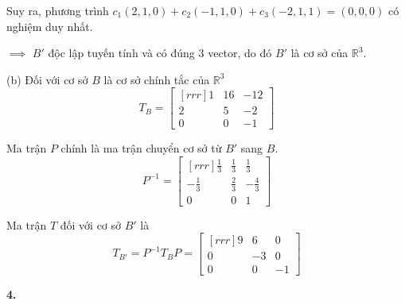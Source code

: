 \documentclass{article}
\newcommand\R{\mathbb{R}}
\begin{document}
    Suy ra, phương trình $c_1(2,1,0) + c_2(-1,1,0) + c_3(-2,1,1) = (0,0,0)$ có nghiệm duy nhất.

    $\implies$ $B'$ độc lập tuyến tính và có đúng $3$ vector, do đó $B'$ là cơ sở của $\R^3$.

    (b) Đối với cơ sở $B$ là cơ sở chính tắc của $ \R^3 $
    \[T_B = \begin{bmatrix}[rrr]
        1 & 16 & -12 \\
        2 & 5 & -2 \\
        0 & 0 & -1 
    \end{bmatrix} \]

    Ma trận $P$ chính là ma trận chuyển cơ sở từ $B'$ sang $B$. 
    \[P^{-1} = \begin{bmatrix}[rrr]
        \frac{1}{3} & \frac{1}{3} & \frac{1}{3} \\
        - \frac{1}{3} & \frac{2}{3} & -\frac{4}{3} \\
        0 & 0 & 1 
    \end{bmatrix} \]

    Ma trận $T$ đối với cơ sở $B'$ là 
    \[T_{B'} = P^{-1}T_BP = \begin{bmatrix}[rrr]
        9 & 6 & 0 \\
        0 & -3 & 0 \\
        0 & 0 & -1 
    \end{bmatrix} \]

    \textbf{4.} 
\end{document}
